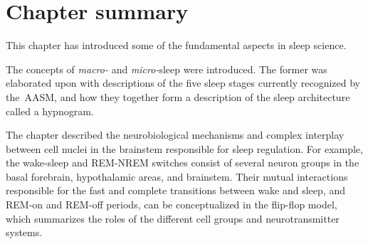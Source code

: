     \section{Chapter summary}
    
    This chapter has introduced some of the fundamental aspects in sleep science.
    
    The concepts of \textit{macro-} and \textit{micro-}sleep were introduced.
    The former was elaborated upon with descriptions of the five sleep stages%
    currently recognized by the~\ac{AASM}, and how they together form a description of the sleep architecture called a hypnogram.
    
    The chapter described the neurobiological mechanisms and complex interplay between cell nuclei in the brainstem responsible for sleep regulation.
    For example, the wake-sleep and \ac{REM}-\ac{NREM} switches consist of several neuron groups in the basal forebrain, hypothalamic areas, and brainstem.
    Their mutual interactions responsible for the fast and complete transitions between wake and sleep, and \ac{REM}-on and \ac{REM}-off periods, can be conceptualized in the flip-flop model, which summarizes the roles of the different cell groups and neurotransmitter systems.
    
